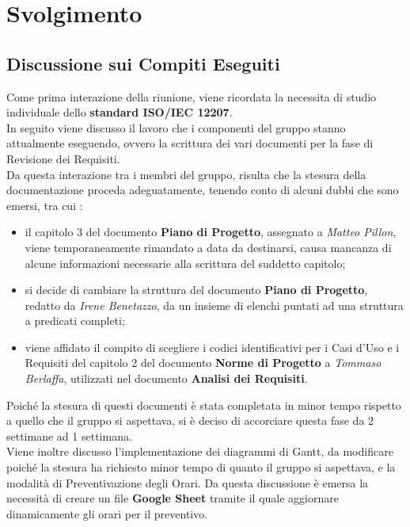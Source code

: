 \section{Svolgimento}
\subsection{Discussione sui Compiti Eseguiti}
	Come prima interazione della riunione, viene ricordata la necessita di studio individuale dello \textbf{standard ISO/IEC 12207}. \\
	In seguito viene discusso il lavoro che i componenti del gruppo stanno attualmente eseguendo, ovvero la scrittura dei vari documenti per la fase di Revisione dei Requisiti. \\
	Da questa interazione tra i membri del gruppo, risulta che la stesura della documentazione proceda adeguatamente, tenendo conto di alcuni dubbi che sono emersi, tra cui : 
	\begin{itemize}
		\item il capitolo 3 del documento \textbf{Piano di Progetto}, assegnato a \textit{Matteo Pillon}, viene temporaneamente rimandato a data da destinarsi, causa mancanza di alcune informazioni necessarie alla scrittura del suddetto capitolo;
		\item si decide di cambiare la struttura del documento \textbf{Piano di Progetto}, redatto da \textit{Irene Benetazzo}, da un insieme di elenchi puntati ad una struttura a predicati completi;
		\item viene affidato il compito di scegliere i codici identificativi per i Casi d'Uso e i Requisiti del capitolo 2 del documento \textbf{Norme di Progetto} a \textit{Tommaso Berlaffa}, utilizzati nel documento \textbf{Analisi dei Requisiti}.
	\end{itemize}
	Poiché la stesura di questi documenti è stata completata in minor tempo rispetto a quello che il gruppo si aspettava, si è deciso di accorciare questa fase da 2 settimane ad 1 settimana. \\
	Viene inoltre discusso l'implementazione dei diagrammi di Gantt, da modificare poiché la stesura ha richiesto minor tempo di quanto il gruppo si aspettava, e la modalità di Preventivazione degli Orari. Da questa discussione è emersa la necessità di creare un file \textbf{Google Sheet} tramite il quale aggiornare dinamicamente gli orari per il preventivo.
	
